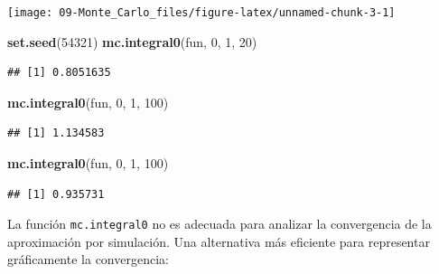 \documentclass[]{book}
\newenvironment{Shaded}{\begin{snugshade}}{\end{snugshade}}
\newcommand{\KeywordTok}[1]{\textcolor[rgb]{0.13,0.29,0.53}{\textbf{#1}}}
\newcommand{\DecValTok}[1]{\textcolor[rgb]{0.00,0.00,0.81}{#1}}
\newcommand{\NormalTok}[1]{#1}
\theoremstyle{definition}
\theoremstyle{definition}
\theoremstyle{definition}
\theoremstyle{remark}
\begin{document}
\begin{center}\texttt{[image: 09-Monte\_Carlo\_files/figure-latex/unnamed-chunk-3-1]} \end{center}

\begin{Shaded}
\begin{Highlighting}[]
\KeywordTok{set.seed}\NormalTok{(}\DecValTok{54321}\NormalTok{)}
\KeywordTok{mc.integral0}\NormalTok{(fun, }\DecValTok{0}\NormalTok{, }\DecValTok{1}\NormalTok{, }\DecValTok{20}\NormalTok{)}
\end{Highlighting}
\end{Shaded}

\begin{verbatim}
## [1] 0.8051635
\end{verbatim}

\begin{Shaded}
\begin{Highlighting}[]
\KeywordTok{mc.integral0}\NormalTok{(fun, }\DecValTok{0}\NormalTok{, }\DecValTok{1}\NormalTok{, }\DecValTok{100}\NormalTok{)}
\end{Highlighting}
\end{Shaded}

\begin{verbatim}
## [1] 1.134583
\end{verbatim}

\begin{Shaded}
\begin{Highlighting}[]
\KeywordTok{mc.integral0}\NormalTok{(fun, }\DecValTok{0}\NormalTok{, }\DecValTok{1}\NormalTok{, }\DecValTok{100}\NormalTok{)}
\end{Highlighting}
\end{Shaded}

\begin{verbatim}
## [1] 0.935731
\end{verbatim}

La función \texttt{mc.integral0} no es adecuada para analizar la
convergencia de la aproximación por simulación. Una alternativa más
eficiente para representar gráficamente la convergencia:
\end{document}
